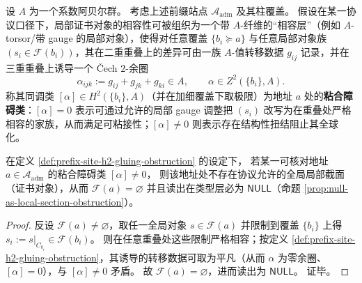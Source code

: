 \begin{definition}\label{def:prefix-site-h2-gluing-obstruction}
设 \(A\) 为一个系数阿贝尔群。
考虑上述前缀站点 \(\mathcal{A}_{\mathrm{adm}}\) 及其柱覆盖。
假设在某一协议口径下，局部证书对象的相容性可被组织为一个带 \(A\)-纤维的“相容层”（例如 \(A\)-torsor/带 gauge 的局部对象），使得对任意覆盖 \(\{b_i\succeq a\}\) 与任意局部对象族 \((s_i\in\mathscr{F}(b_i))\)，其在二重重叠上的差异可由一族 \(A\)-值转移数据 \(g_{ij}\) 记录，并在三重重叠上诱导一个 Čech \(2\)-余圈
\[
\alpha_{ijk}:=g_{ij}+g_{jk}+g_{ki}\in A,
\qquad
\alpha\in Z^2(\{b_i\},A).
\]
称其同调类 \([\alpha]\in H^2(\{b_i\},A)\)（并在加细覆盖下取极限）为地址 \(a\) 处的\textbf{粘合障碍类}：\([\alpha]=0\) 表示可通过允许的局部 gauge 调整把 \((s_i)\) 改写为在重叠处严格相容的家族，从而满足可粘接性；\([\alpha]\neq 0\) 则表示存在结构性扭结阻止其全球化。
\end{definition}

\begin{proposition}\label{prop:null-as-h2-obstruction}
在定义 \ref{def:prefix-site-h2-gluing-obstruction} 的设定下，
若某一可核对地址 \(a\in\mathcal{A}_{\mathrm{adm}}\) 的粘合障碍类 \([\alpha]\neq 0\)，
则该地址处不存在协议允许的全局局部截面（证书对象），从而
\(
\mathscr{F}(a)=\varnothing
\)
并且读出在类型层必为 \(\mathsf{NULL}\)（命题 \ref{prop:null-as-local-section-obstruction}）。
\end{proposition}

\begin{proof}
反设 \(\mathscr{F}(a)\neq\varnothing\)，取任一全局对象 \(s\in\mathscr{F}(a)\) 并限制到覆盖 \(\{b_i\}\) 上得 \(s_i:=s|_{C_{b_i}}\in\mathscr{F}(b_i)\)。
则在任意重叠处这些限制严格相容；按定义 \ref{def:prefix-site-h2-gluing-obstruction}，其诱导的转移数据可取为平凡（从而 \(\alpha\) 为零余圈、\([\alpha]=0\)），与 \([\alpha]\neq 0\) 矛盾。
故 \(\mathscr{F}(a)=\varnothing\)，进而读出为 \(\mathsf{NULL}\)。
证毕。
\end{proof}